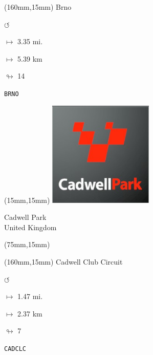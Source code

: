 \begin{textblock*}{40mm}(160mm,15mm)%
Brno
\par \Huge$\circlearrowleft$
\Large
\par$\mapsto$ 3.35 mi.
\par$\mapsto$ 5.39 km
\par$\looparrowright$ 14
\par\hfill\tiny\tt BRNO\\
\end{textblock*}
\null\newpage

\begin{textblock*}{50mm}(15mm,15mm)%
\includegraphics[width=50mm]{LG/2015-05-20_00076.png}
\par Cadwell Park\\ United Kingdom
\end{textblock*}
\begin{textblock*}{80mm}(75mm,15mm)%
\end{textblock*}
\begin{textblock*}{40mm}(160mm,15mm)%
Cadwell Club Circuit
\par \Huge$\circlearrowleft$
\Large
\par$\mapsto$ 1.47 mi.
\par$\mapsto$ 2.37 km
\par$\looparrowright$ 7
\par\hfill\tiny\tt CADCLC\\
\end{textblock*}
